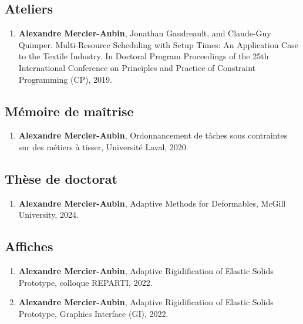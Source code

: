 \documentclass[10pt]{article} %
\begin{document}
\subsection{Ateliers}
\begin{enumerate}
  \setcounter{enumi}{\value{listCounter}}
  \item \textbf{Alexandre Mercier-Aubin}, Jonathan Gaudreault, and Claude-Guy Quimper. Multi-Resource Scheduling with Setup Times:
An Application Case to the Textile Industry. In  Doctoral Program Proceedings of the 25th International
Conference on Principles and Practice of Constraint Programming (CP), 2019. 

\end{enumerate}

\subsection{Mémoire de maîtrise}
\begin{enumerate}
  \setcounter{enumi}{\value{listCounter}}
  \item \textbf{Alexandre Mercier-Aubin}, Ordonnancement de tâches sous contraintes sur des métiers à tisser, Université Laval, 2020. 
\end{enumerate}

\subsection{Thèse de doctorat}
\begin{enumerate}
  \setcounter{enumi}{\value{listCounter}}
  \item \textbf{Alexandre Mercier-Aubin}, Adaptive Methods for Deformables, McGill University, 2024. 
\end{enumerate}

\subsection{Affiches}
\begin{enumerate}
  \setcounter{enumi}{\value{listCounter}}
  \item \textbf{Alexandre Mercier-Aubin}, Adaptive Rigidification of Elastic Solids Prototype, colloque REPARTI, 2022. 
  \item \textbf{Alexandre Mercier-Aubin}, Adaptive Rigidification of Elastic Solids Prototype, Graphics Interface (GI), 2022. 
\end{enumerate}
\end{document}
